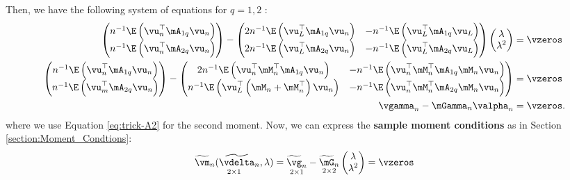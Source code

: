 \documentclass[english,12pt]{book}\usepackage[]{graphicx}\usepackage[]{xcolor}
\begin{document}
Then, we have the following system of equations for $q = 1, 2$ \citep[see][pag 56]{kelejian2010specification}:
\begin{equation}\label{eq:system-gmm-general}
\begin{aligned}
  \begin{pmatrix}
    n^{-1}\E\left(\vu^\top_n\mA_{1q}\vu_n \right)  \\
    n^{-1}\E\left(\vu^\top_n\mA_{2q}\vu_n \right) 
  \end{pmatrix} -
  \begin{pmatrix}
    2n^{-1}\E\left(\vu_L^\top\mA_{1q}\vu_n\right) &   -n^{-1}\E\left(\vu_L^\top\mA_{1q}\vu_L\right)   \\
    2n^{-1}\E\left(\vu_L^\top\mA_{2q}\vu_n\right) &   -n^{-1}\E\left(\vu_L^\top\mA_{2q}\vu_L\right)
  \end{pmatrix}
  \begin{pmatrix}
  \lambda \\
  \lambda^2
  \end{pmatrix}
  & = \vzeros \\
    \begin{pmatrix}
    n^{-1}\E\left(\vu^\top_n\mA_{1q}\vu_n \right)   \\
    n^{-1}\E\left(\vu^\top_m\mA_{2q}\vu_n \right) 
  \end{pmatrix}-
  \begin{pmatrix}
    2n^{-1}\E\left(\vu^\top_n\mM^\top_n\mA_{1q}\vu_n\right) &   -n^{-1}\E\left(\vu^\top_n\mM^\top_n\mA_{1q}\mM_n\vu_n\right)   \\
    n^{-1}\E\left(\vu_L^\top\left(\mM_n + \mM^\top_n\right)\vu_n\right) &   -n^{-1}\E\left(\vu^\top_n\mM^\top_n\mA_{2q}\mM_n\vu_n\right)
  \end{pmatrix} & = \vzeros \\
  \vgamma_n - \mGamma_n\valpha_n &= \vzeros. 
\end{aligned}
\end{equation}
%
where we use Equation \eqref{eq:trick-A2} for the second moment. Now, we can express the \textbf{sample moment conditions} as in Section \ref{section:Moment_Condtions}:
\begin{equation*}
	\underset{2 \times 1}{\widetilde{\vm}_n(\widetilde{\vdelta}_n, \lambda)} = \underset{2 \times 1}{\widetilde{\vg}_n} - \underset{2 \times 2}{\widetilde{\mG}_n}\begin{pmatrix}\lambda \\ \lambda^2\end{pmatrix} = \vzeros
\end{equation*}
\end{document}
